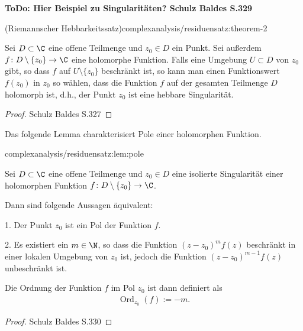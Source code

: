 \documentclass[letterpaper,10pt,german]{jupyterBook}
\begin{document}
\par
\textbf{ToDo: Hier Beispiel zu Singularitäten? Schulz Baldes S.329}
\begin{theorem}{(Riemannscher Hebbarkeitssatz)}{complexanalysis/residuensatz:theorem-2}



\par
Sei \(D \subset \C\) eine offene Teilmenge und \(z_0 \in D\) ein Punkt.
Sei außerdem \(f \colon D \setminus \{z_0\} \rightarrow \C\) eine holomorphe Funktion.
Falls eine Umgebung \(U \subset D\) von \(z_0\) gibt, so dass \(f\) auf \(U \setminus \{z_0\}\) beschränkt ist, so kann man einen Funktionswert \(f(z_0)\) in \(z_0\) so wählen, dass die Funktion \(f\) auf der gesamten Teilmenge \(D\) holomorph ist, d.h., der Punkt \(z_0\) ist eine hebbare Singularität.
\end{theorem}

\begin{proof}
 Schulz Baldes S.327
\end{proof}

\par
Das folgende Lemma charakterisiert Pole einer holomorphen Funktion.
\begin{lemma}{}{complexanalysis/residuensatz:lem:pole}



\par
Sei \(D \subset \C\) eine offene Teilmenge und \(z_0 \in D\) eine isolierte Singularität einer holomorphen Funktion \(f \colon D \setminus \{z_0\} \rightarrow \C\).

\par
Dann sind folgende Aussagen äquivalent:

\par
1. Der Punkt \(z_0\) ist ein Pol der Funktion \(f\).

\par
2. Es existiert ein \(m \in \N\), so dass die Funktion \((z - z_0)^m f(z)\) beschränkt in einer lokalen Umgebung von \(z_0\) ist, jedoch die Funktion \((z - z_0)^{m-1} f(z)\) unbeschränkt ist.

\par
Die Ordnung der Funktion \(f\) im Pol \(z_0\) ist dann definiert als
\begin{align*}
\operatorname{Ord}_{z_0}(f) := -m.
\end{align*}\end{lemma}

\begin{proof}
 Schulz Baldes S.330
\end{proof}
\end{document}
